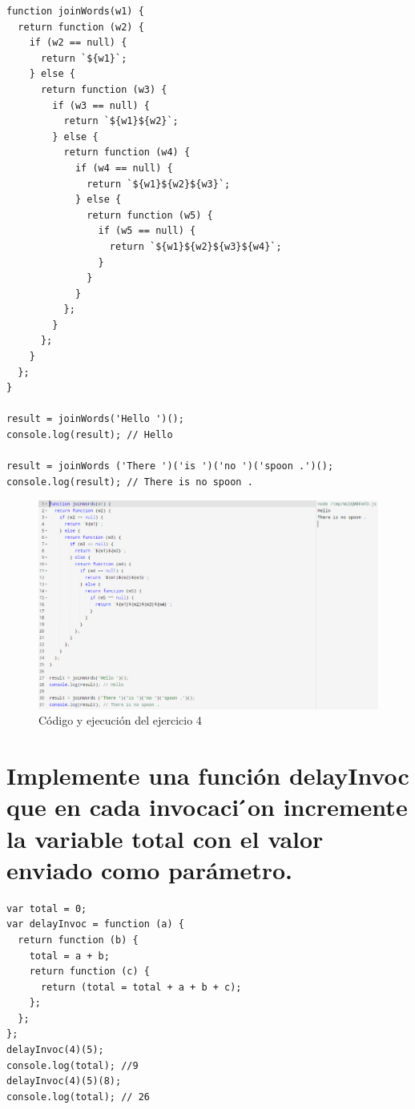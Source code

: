 \documentclass{article}
\begin{document}
\begin{verbatim}
function joinWords(w1) {
  return function (w2) {
    if (w2 == null) {
      return `${w1}`;
    } else {
      return function (w3) {
        if (w3 == null) {
          return `${w1}${w2}`;
        } else {
          return function (w4) {
            if (w4 == null) {
              return `${w1}${w2}${w3}`;
            } else {
              return function (w5) {
                if (w5 == null) {
                  return `${w1}${w2}${w3}${w4}`;
                }
              }
            }
          };
        }
      };
    }
  };
}

result = joinWords('Hello ')();
console.log(result); // Hello

result = joinWords ('There ')('is ')('no ')('spoon .')();
console.log(result); // There is no spoon .
\end{verbatim}

\begin{figure}
\centering
\includegraphics[width=1\textwidth]{ejercicio4.png}
\caption{\label{fig:frog}Código y ejecución del ejercicio 4}
\end{figure}

\section{Implemente una función  delayInvoc que en cada invocaci ́on incremente la variable total con el valor enviado como parámetro.}

\begin{verbatim}
var total = 0;
var delayInvoc = function (a) {
  return function (b) {
    total = a + b;
    return function (c) {
      return (total = total + a + b + c);
    };
  };
};
delayInvoc(4)(5);
console.log(total); //9
delayInvoc(4)(5)(8);
console.log(total); // 26
\end{verbatim}
\end{document}
